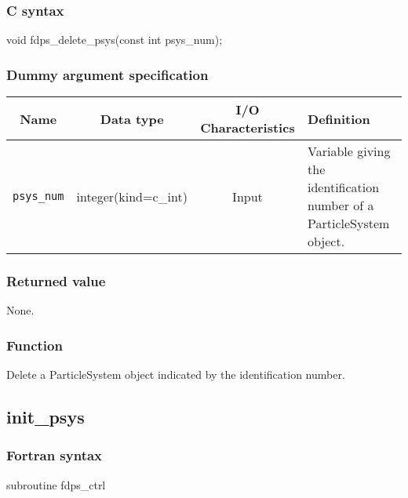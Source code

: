 \subsubsection*{C syntax}
\begin{screen}
\begin{spverbatim}
void fdps_delete_psys(const int psys_num);
\end{spverbatim}
\end{screen}

\subsubsection*{Dummy argument specification}
\begin{table}[h]
\begin{tabularx}{\linewidth}{cccX}
\toprule
\rowcolor{Snow2}
Name & Data type & I/O Characteristics & Definition \\  
\midrule
\texttt{psys\_num} & integer(kind=c\_int) & Input & Variable giving the identification number of a ParticleSystem object. \\
\bottomrule
\end{tabularx}
\end{table}

\subsubsection*{Returned value}
None.

\subsubsection*{Function}
Delete a ParticleSystem object indicated by the identification number.

\clearpage

\subsection{init\_psys}
\subsubsection*{Fortran syntax}
\begin{screen}
\begin{spverbatim}
subroutine fdps_ctrl%
\end{spverbatim}
\end{screen}

